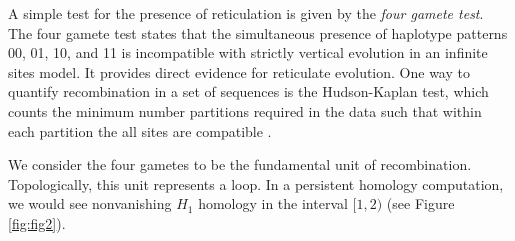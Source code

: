 A simple test for the presence of reticulation is given by the \emph{four gamete test}.
The four gamete test states that the simultaneous presence of haplotype patterns 00, 01, 10, and 11 is incompatible with strictly vertical evolution in an infinite sites model.
It provides direct evidence for reticulate evolution.
One way to quantify recombination in a set of sequences is the Hudson-Kaplan test, which counts the minimum number partitions required in the data such that within each partition the all sites are compatible \citep{Hudson:1985}.

We consider the four gametes to be the fundamental unit of recombination.
Topologically, this unit represents a loop.
In a persistent homology computation, we would see nonvanishing $H_1$ homology in the interval $[1,2)$ (see Figure \ref{fig:fig2}).



